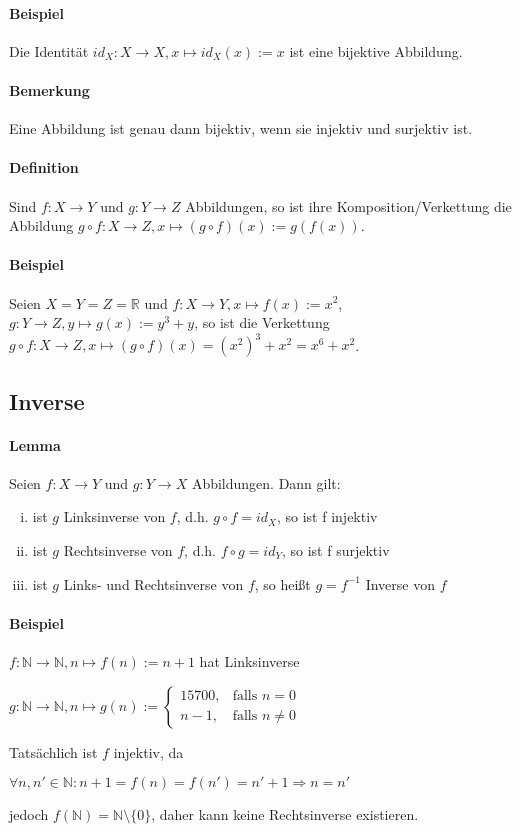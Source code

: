 \documentclass[12pt,a4paper,parskip=half-,DIV=15]{scrartcl}
\begin{document}
\paragraph{Beispiel} Die Identität $id_X :X\to X, x\mapsto id_X(x):= x$ ist eine bijektive Abbildung.
\paragraph{Bemerkung} Eine Abbildung ist genau dann bijektiv, wenn sie injektiv und surjektiv ist.
\paragraph{Definition} Sind $ f:X\to Y $ und $ g:Y\to Z$ Abbildungen, so ist ihre Komposition/Verkettung die Abbildung $ g\circ f:X\to Z, x\mapsto (g\circ f)(x):= g(f(x)) $.
\paragraph{Beispiel} Seien $ X = Y = Z = \mathbb{R} $ und $ f:X\to Y, x\mapsto f(x) :=x^2 $, $ g:Y\to Z, y\mapsto g(x):=y^3 + y $, so ist die Verkettung $ g\circ f: X\to Z, x\mapsto (g\circ f)(x) = (x^2)^3+x^2 = x^6 + x^2 $.

\subsection{Inverse}
\paragraph{Lemma} Seien $ f:X\to Y $ und $ g:Y\to X $ Abbildungen. Dann gilt:
\begin{enumerate}[i)]
\item ist $ g $ Linksinverse von $ f $, d.h. $ g\circ f = id_X $, so ist f injektiv
\item ist $ g $ Rechtsinverse von $ f $, d.h. $ f\circ g = id_Y$, so ist f surjektiv
\item ist $ g $ Links- und Rechtsinverse von $ f $, so heißt $ g =f^{-1}$ Inverse von $ f $
\end{enumerate}

\paragraph{Beispiel} $ f:\mathbb{N}\to \mathbb{N}, n\mapsto f(n):= n+1 $ hat Linksinverse 
\begin{center}
$ g:\mathbb{N} \to \mathbb{N}, n\mapsto g(n):=\left\{
\begin{array}{cl}
15700, & \text{falls } n=0\\
n-1, & \text{falls } n\neq 0
\end{array} \right. $
\end{center}
Tatsächlich ist $ f $ injektiv, da
\begin{center}
$ \forall n,n'\in \mathbb{N} : n+1 = f(n) = f(n') = n'+1 \Rightarrow n=n' $
\end{center}
jedoch $ f(\mathbb{N}) = \mathbb{N}\setminus \{0\} $, daher kann keine Rechtsinverse existieren.
\end{document}
